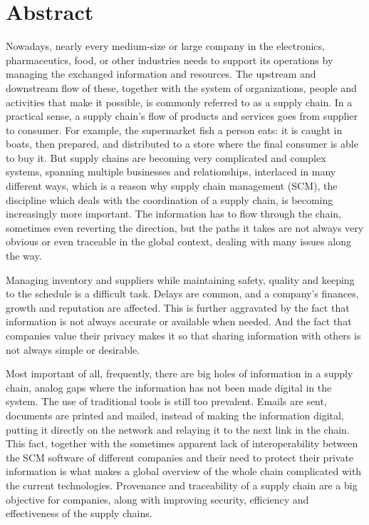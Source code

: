 \chapter{Abstract}


Nowadays, nearly every medium-size or large company in the electronics, pharmaceutics, food, or other industries needs to support its operations by managing the exchanged information and resources. The upstream and downstream flow of these, together with the system of organizations, people and activities that make it possible, is commonly referred to as a supply chain. In a practical sense, a supply chain’s flow of products and services goes from supplier to consumer. For example, the supermarket fish a person eats: it is caught in boats, then prepared, and distributed to a store where the final consumer is able to buy it. But supply chains are becoming very complicated and complex systems, spanning multiple businesses and relationships, interlaced in many different ways, which is a reason why supply chain management (SCM), the discipline which deals with the coordination of a supply chain, is becoming increasingly more important.  The information has to flow through the chain, sometimes even reverting the direction, but the paths it takes are not always very obvious or even traceable in the global context, dealing with many issues along the way.

Managing inventory and suppliers while maintaining safety, quality and keeping to the schedule is a difficult task. Delays are common, and a company’s finances, growth and reputation are affected. This is further aggravated by the fact that information is not always accurate or available when needed. And the fact that companies value their privacy makes it so that sharing information with others is not always simple or desirable. 

Most important of all, frequently, there are big holes of information in a supply chain, analog gaps where the information has not been made digital in the system. The use of traditional tools is still too prevalent. Emails are sent, documents are printed and mailed, instead of making the information digital, putting  it directly on the network and relaying it to the next link in the chain. This fact, together with the sometimes apparent lack of interoperability between the SCM software of different companies and their need to protect their private information is what makes a global overview of the whole chain complicated with the current technologies. Provenance and traceability of a supply chain are a big objective for companies, along with improving security, efficiency and effectiveness of the supply chains.

